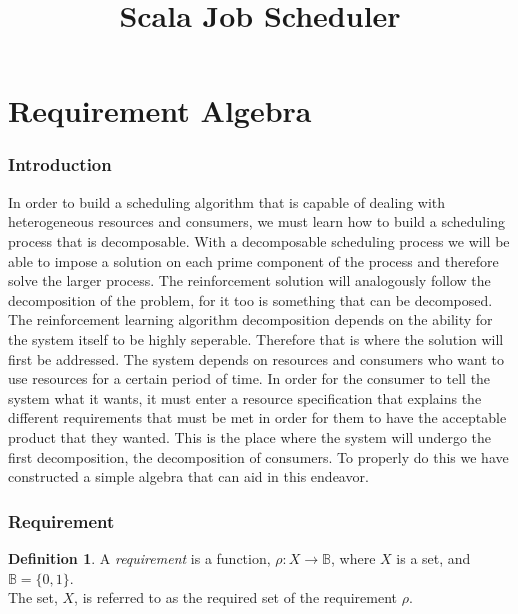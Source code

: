 \documentclass{article}
\title{Scala Job Scheduler}
\theoremstyle{definition}
\newtheorem{definition}{Definition}[part]
\theoremstyle{remark}
\theoremstyle{definition}
\newcommand{\reqfunc}[2]{#1:#2\rightarrow\mathbb{B}}
\begin{document}
	\part{Requirement Algebra}
	
        \section{Introduction}

                In order to build a scheduling algorithm that is capable of dealing with heterogeneous resources and consumers,
             we must learn how to build a scheduling process that is decomposable. With a decomposable scheduling process we
             will be able to impose a solution on each prime component of the process and therefore solve the larger process.
             The reinforcement solution will analogously follow the decomposition of the problem, for it too is something that
             can be decomposed.  \\

                The reinforcement learning algorithm decomposition depends on the ability for the system itself to be highly
             seperable. Therefore that is where the solution will first be addressed. The system depends on resources and
             consumers who want to use resources for a certain period of time. In order for the consumer to tell the system
             what it wants, it must enter a resource specification that explains the different requirements that must be met
             in order for them to have the acceptable product that they wanted. This is the place where the system will undergo
             the first decomposition, the decomposition of consumers. To properly do this we have constructed a simple algebra
             that can aid in this endeavor.
	
        \section{Requirement}

            \begin{definition}
                A \emph{requirement} is a function, $\reqfunc{\rho}{X}$, where $X$ is a set, and $\mathbb{B} = \{0,1\}$.\\

                The set, $X$, is referred to as the required set of the requirement $\rho$.
            \end{definition}
\end{document}
